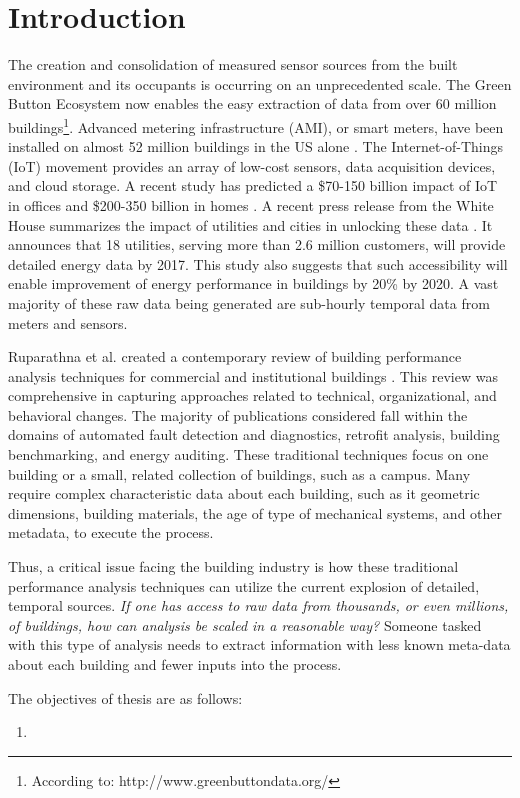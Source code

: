 \section{Introduction}

The creation and consolidation of measured sensor sources from the built environment and its occupants is occurring on an unprecedented scale. The Green Button Ecosystem now enables the easy extraction of data from over 60 million buildings\footnote{According to: http://www.greenbuttondata.org/}. Advanced metering infrastructure (AMI), or smart meters, have been installed on almost 52 million buildings in the US alone \cite{energy_information_administration_how_2015}. The Internet-of-Things (IoT) movement provides an array of low-cost sensors, data acquisition devices, and cloud storage. A recent study has predicted a \$70-150 billion impact of IoT in offices and \$200-350 billion in homes \cite{james_manyika_unlocking_2015}. A recent press release from the White House summarizes the impact of utilities and cities in unlocking these data \cite{_fact_2016}. It announces that 18 utilities, serving more than 2.6 million customers, will provide detailed energy data by 2017. This study also suggests that such accessibility will enable improvement of energy performance in buildings by 20\% by 2020. A vast majority of these raw data being generated are sub-hourly temporal data from meters and sensors.

Ruparathna et al. created a contemporary review of building performance analysis techniques for commercial and institutional buildings \cite{ruparathna_improving_2016}. This review was comprehensive in capturing approaches related to technical, organizational, and behavioral changes. The majority of publications considered fall within the domains of automated fault detection and diagnostics, retrofit analysis, building benchmarking, and energy auditing. These traditional techniques focus on one building or a small, related collection of buildings, such as a campus. Many require complex characteristic data about each building, such as it geometric dimensions, building materials, the age of type of mechanical systems, and other metadata, to execute the process. 

Thus, a critical issue facing the building industry is how these traditional performance analysis techniques can utilize the current explosion of detailed, temporal sources. \emph{If one has access to raw data from thousands, or even millions, of buildings, how can analysis be scaled in a reasonable way?} Someone tasked with this type of analysis needs to extract information with less known meta-data about each building and fewer inputs into the process. 

The objectives of thesis are as follows:
\begin{enumerate}
\item 
\end{enumerate}

